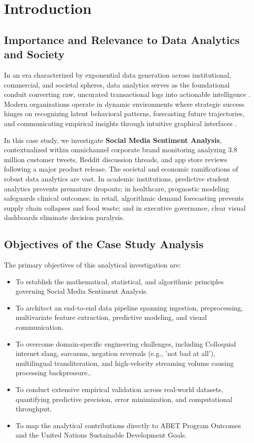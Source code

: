 \section{Introduction}

\subsection{Importance and Relevance to Data Analytics and Society}
In an era characterized by exponential data generation across institutional, commercial, and societal spheres, data analytics serves as the foundational conduit converting raw, uncurated transactional logs into actionable intelligence \cite{provost2013data}. Modern organizations operate in dynamic environments where strategic success hinges on recognizing latent behavioral patterns, forecasting future trajectories, and communicating empirical insights through intuitive graphical interfaces \cite{han2011data}.

In this case study, we investigate \textbf{Social Media Sentiment Analysis}, contextualized within omnichannel corporate brand monitoring analyzing 3.8 million customer tweets, Reddit discussion threads, and app store reviews following a major product release. The societal and economic ramifications of robust data analytics are vast. In academic institutions, predictive student analytics prevents premature dropouts; in healthcare, prognostic modeling safeguards clinical outcomes; in retail, algorithmic demand forecasting prevents supply chain collapses and food waste; and in executive governance, clear visual dashboards eliminate decision paralysis.

\subsection{Objectives of the Case Study Analysis}
The primary objectives of this analytical investigation are:
\begin{itemize}
  \item To establish the mathematical, statistical, and algorithmic principles governing Social Media Sentiment Analysis.
  \item To architect an end-to-end data pipeline spanning ingestion, preprocessing, multivariate feature extraction, predictive modeling, and visual communication.
  \item To overcome domain-specific engineering challenges, including Colloquial internet slang, sarcasms, negation reversals (e.g., 'not bad at all'), multilingual transliteration, and high-velocity streaming volume causing processing backpressure..
  \item To conduct extensive empirical validation across real-world datasets, quantifying predictive precision, error minimization, and computational throughput.
  \item To map the analytical contributions directly to ABET Program Outcomes and the United Nations Sustainable Development Goals.
\end{itemize}
